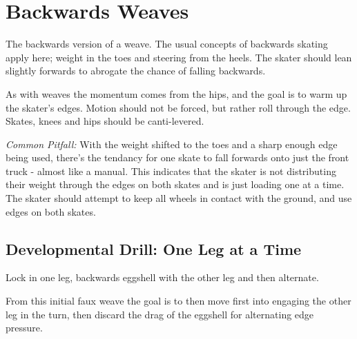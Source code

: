 \section{Backwards Weaves}
\label{sec:sticky/backwards_carves}

The backwards version of a weave. 
The usual concepts of backwards skating apply here; weight in the toes and steering from the heels. 
The skater should lean slightly forwards to abrogate the chance of falling backwards.

As with weaves the momentum comes from the hips, and the goal is to warm up the skater's edges.   
Motion should not be forced, but rather roll through the edge.
Skates, knees and hips should be canti-levered.


{\it Common Pitfall:}
With the weight shifted to the toes and a sharp enough edge being used, there's the tendancy for one skate to fall forwards onto just the front truck - almost like a manual. 
This indicates that the skater is not distributing their weight through the edges on both skates and is just loading one at a time.  
The skater should attempt to keep all wheels in contact with the ground, and use edges on both skates.


\subsection*{Developmental Drill: One Leg at a Time}
Lock in one leg, backwards eggshell with the other leg and then alternate.

From this initial faux weave the goal is to then move first into engaging the other leg in the turn, then discard the drag of the eggshell for alternating edge pressure. 
